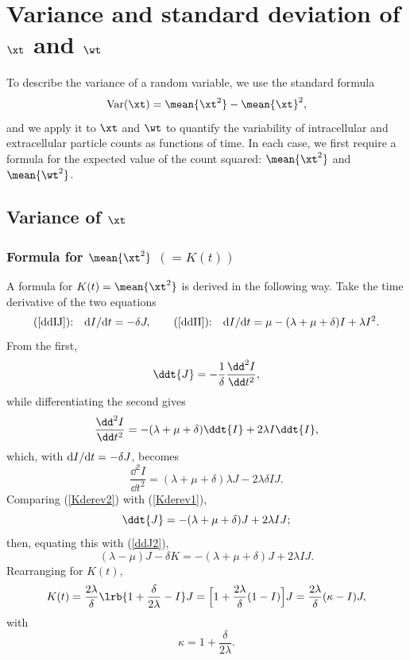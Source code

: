 \section{Variance and standard deviation of $\xt$ and $\wt$}
\label{sec:variance}

To describe the variance of a random variable, we use the standard formula
\begin{equation*}
\text{Var}(\xt) = \mean{\xt^2} - \mean{\xt}^2,
\end{equation*}
and we apply it to $\xt$ and $\wt$ to quantify the variability of intracellular
and extracellular particle counts as functions of time. In each case, we first
require a formula for the expected value of the count squared: $\mean{\xt^2}$
and $\mean{\wt^2}$.

\subsection{Variance of $\xt$}

\subsubsection{Formula for $\mean{\xt^2}$ $(=K(t))$}

A formula for $K(t) = \mean{\xt^2}$ is derived in the following way. Take the
time derivative of the two equations
$$\text{(\ref{ddIJ}):}\quad {\rm d}I/{\rm d}t = -\delta J,\qquad
\text{(\ref{ddII}):}\quad {\rm d}I/{\rm d}t = \mu - (\lambda + \mu + \delta) I + \lambda I^2.$$
From the first,
\begin{equation}
\label{Kderev1}
\ddt{J} = -\frac{1}{\delta}\frac{\dd^2 I}{\dd t^2},
\end{equation}
while differentiating the second gives
$$\frac{\dd^2 I}{\dd t^2} = -(\lambda + \mu + \delta) \ddt{I} + 2\lambda I \ddt{I},$$
which, with ${\rm d}I/{\rm d}t = -\delta J$, becomes
\begin{equation}
\label{Kderev2}
\frac{\dd^2 I}{\dd t^2} = (\lambda + \mu + \delta)\lambda J- 2\lambda \delta I J.
\end{equation}
Comparing (\ref{Kderev2}) with (\ref{Kderev1}),
$$\ddt{J} = -(\lambda + \mu + \delta) J + 2\lambda I J;$$
then, equating this with (\ref{ddJ2}),
$$(\lambda - \mu) J - \delta K = -(\lambda + \mu + \delta) J + 2\lambda I J.$$
Rearranging for $K(t)$,
\begin{equation}
\label{Kt1}
K(t) = \frac{2\lambda}{\delta}\lrb{1+\frac{\delta}{2\lambda} - I}J
= \Bigl[1+\frac{2\lambda}{\delta}(1-I)\Bigr]J
= \frac{2\lambda}{\delta}(\kappa - I)J,
\end{equation}
with
$$\kappa = 1+\frac{\delta}{2\lambda}.$$

